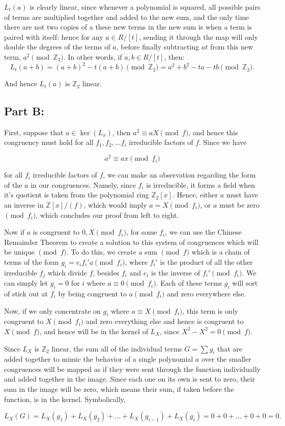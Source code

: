 \documentclass[12pt]{article}
\theoremstyle{moo}
\def\zz{{\mathbb Z}}
\begin{document}
$L_t(a)$ is clearly linear, since whenever a polynomial is squared, all possible pairs of terms are multiplied together and added to the new sum, and the only time there are not two copies of a these new terms in the new sum is when a term is paired with itself: hence for any $ a \in R / \left[ t \right]$, sending it through the map will only double the degrees of the terms of $a$, before finally subtracting $at$ from this new term, $a^2 \pmod{\zz_2}$. In other words, if $a,b \in R/ \left[ t \right]$, then:
\[
L_t(a+b) = \left(a+b\right)^2 - t \left(a + b \right) \pmod{\zz_2} = a^2 + b^2 - ta - tb \pmod{\zz_2}.
\]

And hence $L_t(a)$ is $\zz_2$ linear.

\subsection*{Part B:}

First, suppose that $ a \in \ker(L_x)$, then $a^2 \equiv aX \pmod{f}$, and hence this congruency must hold for all $f_1,f_2, \ldots f_i$ irreducible factors of $f$. Since we have 

\[
    a^2 \equiv ax \pmod{f_i}
\]

for all $f_i$ irreducible factors of $f$, we can make an observation regarding the form of the $a$ in our congruences. Namely, since $f_i$ is irreducible, it forms a field when it's quotient is taken from the polynomial ring $\zz_2 \left[ x \right]$. Hence, either $a$ must have an inverse in $\zz\left[ x \right] / (f)$, which would imply $a = X \pmod{f_i}$, or $a$ must be zero $\pmod{f_i}$, which concludes our proof from left to right.

Now if $a$ is congruent to $0,X \pmod{f_i}$, for some $f_i$, we can use the Chinese Remainder Theorem to create a solution to this system of congruences which will be unique $\pmod{f}$. To do this, we create a sum $\pmod{f}$ which is a chain of terms of the form $g_i = e_if_i'a \pmod{f_i}$, where $f_i'$ is the product of all the other irreducible $f_j$ which divide $f$, besides $f_i$ and $e_i$ is the inverse of $f_i' \pmod {f_i}$. We can simply let $g_i = 0$ for $i$ where $a \equiv 0 \pmod{f_i}$. Each of these terms $g_i$ will sort of stick out at $f_i$ by being congruent to $a \pmod{f_i}$ and zero everywhere else. 

Now, if we only concentrate on $g_i$ where $a \equiv X \pmod f_i$, this term is only congruent to $X \pmod{f_i}$ and zero everything else and hence is congruent to $X \pmod {f}$, and hence will be in the kernel of $L_X$, since $X^2 - X^2 = 0 \pmod{f}$. 

Since $L_X$ is $\zz_2$ linear, the sum all of the individual terms $G = \sum g_i$ that are added together to mimic the behavior of a single polynomial $a$ over the smaller congruences will be mapped as if they were sent through the function individually and added together in the image. Since each one on its own is sent to zero, their sum in the image will be zero, which means their sum, if taken before the function, is in the kernel. Symbolically,

\[
L_X(G) = L_X(g_1) + L_X(g_2) + \ldots + L_X(g_{i-1}) + L_X(g_i) = 0 + 0 + \ldots + 0 + 0 = 0.
\]
\end{document}
